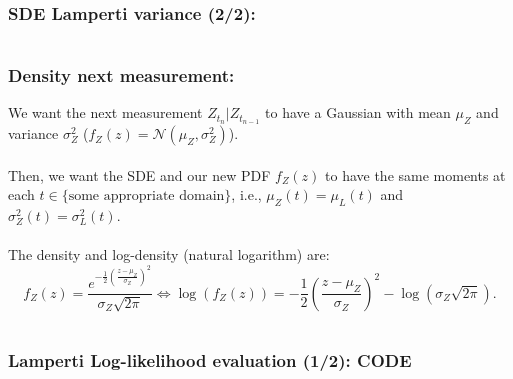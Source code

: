 \documentclass[aspectratio=169]{beamer}\usepackage[utf8]{inputenc}
\begin{document}
\begin{frame}\frametitle{SDE Lamperti variance (2/2):}

\begin{center}
\begin{tabular}{|c|}
\toprule
{\tiny

}\\
\bottomrule
\end{tabular}
\end{center}

\end{frame}


\begin{frame}\frametitle{Density next measurement:}

We want the next measurement $Z_{t_n}|Z_{t_{n-1}}$ to have a Gaussian with mean $\mu_Z$ and variance $\sigma_Z^2$ ($f_Z(z)=\mathcal{N}(\mu_Z,\sigma^2_Z)$).\\
\quad\\
Then, we want the SDE and our new PDF $f_Z(z)$ to have the same moments at each $t\in\{\text{some appropriate domain}\}$, i.e., $\mu_Z(t)=\mu_L(t)$ and $\sigma^2_Z(t)=\sigma^2_L(t)$.\\
\quad\\
The density and log-density (natural logarithm) are:
\begin{equation*}
f_Z(z)=\frac{e^{-\frac{1}{2}\left(\frac{z-\mu_Z}{\sigma_Z}\right)^2}}{\sigma_Z\sqrt{2\pi}}\iff \log(f_Z(z))=-\frac{1}{2}\left(\frac{z-\mu_Z}{\sigma_Z}\right)^2-\log(\sigma_Z\sqrt{2\pi}).
\end{equation*}

\begin{center}
\begin{tabular}{|c|}
\toprule
{\tiny

}\\
\bottomrule
\end{tabular}
\end{center}

\end{frame}


\begin{frame}\frametitle{Lamperti Log-likelihood evaluation (1/2): CODE}

\begin{center}
\begin{tabular}{|c|}
\toprule
{\tiny

}\\
\bottomrule
\end{tabular}
\end{center}

\end{frame}
\end{document}

